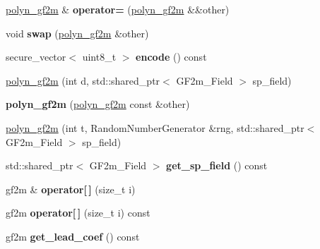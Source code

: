 \begin{DoxyCompactItemize}
\hyperlink{class_botan_1_1polyn__gf2m}{polyn\+\_\+gf2m} \& {\bfseries operator=} (\hyperlink{class_botan_1_1polyn__gf2m}{polyn\+\_\+gf2m} \&\&other)
\item 
\mbox{\label{class_botan_1_1polyn__gf2m_a897c875b6a1326f4ab441b6f139693fb}} 
void {\bfseries swap} (\hyperlink{class_botan_1_1polyn__gf2m}{polyn\+\_\+gf2m} \&other)
\item 
\mbox{\label{class_botan_1_1polyn__gf2m_aee52dfae15a6fcd55e9b3636f49df42c}} 
secure\+\_\+vector$<$ uint8\+\_\+t $>$ {\bfseries encode} () const
\item 
\hyperlink{class_botan_1_1polyn__gf2m_a689acdaa3af60106fac3c2ccb7edc0b7}{polyn\+\_\+gf2m} (int d, std\+::shared\+\_\+ptr$<$ G\+F2m\+\_\+\+Field $>$ sp\+\_\+field)
\item 
\mbox{\label{class_botan_1_1polyn__gf2m_af6db5c639da9ef5db538030d9754295e}} 
{\bfseries polyn\+\_\+gf2m} (\hyperlink{class_botan_1_1polyn__gf2m}{polyn\+\_\+gf2m} const \&other)
\item 
\hyperlink{class_botan_1_1polyn__gf2m_a249c5142d1c1ba263f863ed5f92ba319}{polyn\+\_\+gf2m} (int t, Random\+Number\+Generator \&rng, std\+::shared\+\_\+ptr$<$ G\+F2m\+\_\+\+Field $>$ sp\+\_\+field)
\item 
\mbox{\label{class_botan_1_1polyn__gf2m_afa41c7e3878ef9bcab54625da96eeea1}} 
std\+::shared\+\_\+ptr$<$ G\+F2m\+\_\+\+Field $>$ {\bfseries get\+\_\+sp\+\_\+field} () const
\item 
\mbox{\label{class_botan_1_1polyn__gf2m_a19583ef1d75251eef28c5440f2fa1838}} 
gf2m \& {\bfseries operator\mbox{[}$\,$\mbox{]}} (size\+\_\+t i)
\item 
\mbox{\label{class_botan_1_1polyn__gf2m_ab1e3ce1cb593b6aaf8734a62535e6d0e}} 
gf2m {\bfseries operator\mbox{[}$\,$\mbox{]}} (size\+\_\+t i) const
\item 
\mbox{\label{class_botan_1_1polyn__gf2m_a6af8d0534545c51598f824d292aa9c1a}} 
gf2m {\bfseries get\+\_\+lead\+\_\+coef} () const
\item 
\mbox{\label{class_botan_1_1polyn__gf2m_a9dae23a439e281b75b7b814e3bcf150a}} 

\end{DoxyCompactItemize}
